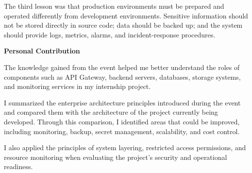The third lesson was that production environments must be prepared and
operated differently from development environments. Sensitive
information should not be stored directly in source code; data should be
backed up; and the system should provide logs, metrics, alarms, and
incident-response procedures.

\vspace{0.5em}\noindent\textbf{Personal Contribution}\par

The knowledge gained from the event helped me better understand the
roles of components such as API Gateway, backend servers, databases,
storage systems, and monitoring services in my internship project.

I summarized the enterprise architecture principles introduced during
the event and compared them with the architecture of the project
currently being developed. Through this comparison, I identified areas
that could be improved, including monitoring, backup, secret management,
scalability, and cost control.

I also applied the principles of system layering, restricted access
permissions, and resource monitoring when evaluating the project's
security and operational readiness.
